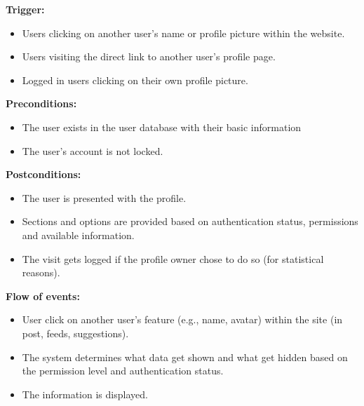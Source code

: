 \documentclass[a4paper]{article}
\begin{document}
        \textbf{Trigger:}
        \begin{itemize}
            \item Users clicking on another user's name or profile picture within the website.
            \item Users visiting the direct link to another user's profile page.
            \item Logged in users clicking on their own profile picture.
        \end{itemize}

        \textbf{Preconditions:}
        \begin{itemize}
            \item The user exists in the user database with their basic information
            \item The user's account is not locked.
        \end{itemize}

        \textbf{Postconditions:}
        \begin{itemize}
            \item The user is presented with the profile.
            \item Sections and options are provided based on authentication status, permissions and available information.
            \item The visit gets logged if the profile owner chose to do so (for statistical reasons).
        \end{itemize}

        \textbf{Flow of events:}
        \begin{itemize}
            \item User click on another user's feature (e.g., name, avatar) within the site (in post, feeds, suggestions).
            \item The system determines what data get shown and what get hidden based on the permission level and authentication status.
            \item The information is displayed.
        \end{itemize}
\end{document}
